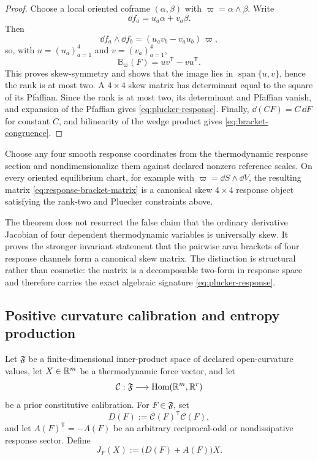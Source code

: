 \begin{proof}
Choose a local oriented coframe $(\alpha,\beta)$ with $\varpi=\alpha\wedge\beta$.  Write
\[
\dd f_a=u_a\alpha+v_a\beta.
\]
Then
\[
\dd f_a\wedge\dd f_b
=(u_av_b-v_au_b)\,\varpi,
\]
so, with $u=(u_a)_{a=1}^4$ and $v=(v_a)_{a=1}^4$,
\begin{equation}
\mathbb B_\varpi(F)=uv^{\mathsf T}-vu^{\mathsf T}.
\label{eq:decomposable-bracket}
\end{equation}
This proves skew-symmetry and shows that the image lies in $\operatorname{span}\{u,v\}$, hence the rank is at most two.  A $4\times4$ skew matrix has determinant equal to the square of its Pfaffian.  Since the rank is at most two, its determinant and Pfaffian vanish, and expansion of the Pfaffian gives \eqref{eq:plucker-response}.  Finally, $\dd(CF)=C\,\dd F$ for constant $C$, and bilinearity of the wedge product gives \eqref{eq:bracket-congruence}.
\end{proof}

\begin{corollary}
Choose any four smooth response coordinates from the thermodynamic response section and nondimensionalize them against declared nonzero reference scales.  On every oriented equilibrium chart, for example with $\varpi=\dd S\wedge\dd V$, the resulting matrix \eqref{eq:response-bracket-matrix} is a canonical skew $4\times4$ response object satisfying the rank-two and Pluecker constraints above.
\end{corollary}

\begin{remark}
The theorem does not resurrect the false claim that the ordinary derivative Jacobian of four dependent thermodynamic variables is universally skew.  It proves the stronger invariant statement that the pairwise area brackets of four response channels form a canonical skew matrix.  The distinction is structural rather than cosmetic: the matrix is a decomposable two-form in response space and therefore carries the exact algebraic signature \eqref{eq:plucker-response}.
\end{remark}

\subsection{Positive curvature calibration and entropy production}

Let $\mathfrak F$ be a finite-dimensional inner-product space of declared open-curvature values, let $X\in\mathbb R^m$ be a thermodynamic force vector, and let
\[
\mathcal C:\mathfrak F\longrightarrow
\operatorname{Hom}(\mathbb R^m,\mathbb R^r)
\]
be a prior constitutive calibration.  For $F\in\mathfrak F$, set
\begin{equation}
D(F):=\mathcal C(F)^{\mathsf T}\mathcal C(F),
\label{eq:curvature-dissipation-operator}
\end{equation}
and let $A(F)^{\mathsf T}=-A(F)$ be an arbitrary reciprocal-odd or nondissipative response sector.  Define
\[
J_F(X):=\bigl(D(F)+A(F)\bigr)X.
\]

